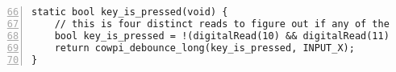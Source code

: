 \renewcommand{\firstline}{66}
\begin{lstlisting}[numberstyle=\color{gray}, numbers=left, firstnumber=\firstline, escapechar=`]
static bool key_is_pressed(void) {
    // this is four distinct reads to figure out if any of the column pins has a 0 on it -- can you do it in one read?
    bool key_is_pressed = !(digitalRead(10) && digitalRead(11) && digitalRead(12) && digitalRead(13));  `\label{code:readColumns}`
    return cowpi_debounce_long(key_is_pressed, INPUT_X);
}
\end{lstlisting}
